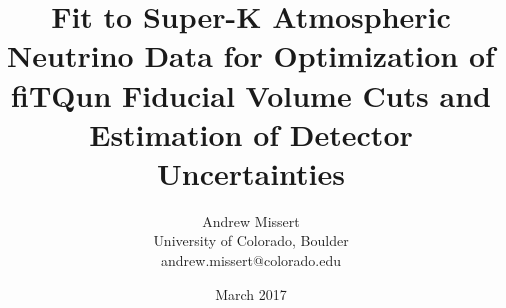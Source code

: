 \documentclass[12pt]{article}
\begin{document}
\title{Fit to Super-K Atmospheric Neutrino Data for Optimization of fiTQun Fiducial
Volume Cuts and Estimation of Detector Uncertainties}
\author{Andrew Missert\\University of Colorado, Boulder\\andrew.missert@colorado.edu}
\date{March 2017}
\maketitle




\FloatBarrier


\FloatBarrier



\FloatBarrier



\FloatBarrier


%

\FloatBarrier



\FloatBarrier


\appendix






{}




\end{document}
